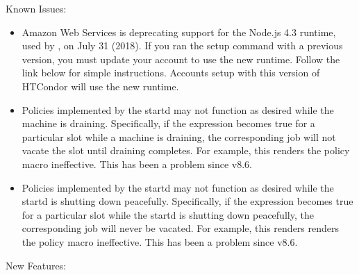 \noindent Known Issues:

\begin{itemize}

\item Amazon Web Services is deprecating support for the Node.js 4.3 runtime,
used by , on July 31 (2018).  If you ran the  setup
command with a previous version, you must update your account to use the new
runtime.  Follow the link below for simple instructions.  Accounts setup with
this version of HTCondor will use the new runtime.

\item Policies implemented by the startd may not function as desired while
the machine is draining.  Specifically, if the  expression
becomes true for a particular slot while a machine is draining, the
corresponding job will not vacate the slot until draining completes.  For
example, this renders the policy macro 
ineffective.  This has been a problem since v8.6.

\item Policies implemented by the startd may not function as desired while
the startd is shutting down peacefully.  Specifically, if the 
expression becomes true for a particular slot while the startd is shutting
down peacefully, the corresponding job will never be vacated.  For example,
this renders renders the policy macro 
ineffective.  This has been a problem since v8.6.

\end{itemize}


\noindent New Features:

